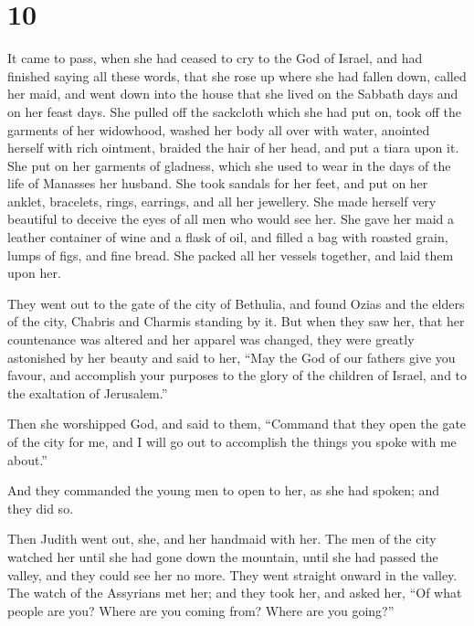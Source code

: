 \hypertarget{section-9}{%
\section{10}\label{section-9}}

 It came to pass, when she had ceased to cry to the God of
Israel, and had finished saying all these words,  that she
rose up where she had fallen down, called her maid, and went down into
the house that she lived on the Sabbath days and on her feast days.
 She pulled off the sackcloth which she had put on, took off
the garments of her widowhood, washed her body all over with water,
anointed herself with rich ointment, braided the hair of her head, and
put a tiara upon it. She put on her garments of gladness, which she used
to wear in the days of the life of Manasses her husband. 
She took sandals for her feet, and put on her anklet, bracelets, rings,
earrings, and all her jewellery. She made herself very beautiful to
deceive the eyes of all men who would see her.  She gave her
maid a leather container of wine and a flask of oil, and filled a bag
with roasted grain, lumps of figs, and fine bread. She packed all her
vessels together, and laid them upon her.

 They went out to the gate of the city of Bethulia, and
found Ozias and the elders of the city, Chabris and Charmis standing by
it.  But when they saw her, that her countenance was altered
and her apparel was changed, they were greatly astonished by her beauty
and said to her,  ``May the God of our fathers give you
favour, and accomplish your purposes to the glory of the children of
Israel, and to the exaltation of Jerusalem.''

Then she worshipped God,  and said to them, ``Command that
they open the gate of the city for me, and I will go out to accomplish
the things you spoke with me about.''

And they commanded the young men to open to her, as she had spoken;
 and they did so.

Then Judith went out, she, and her handmaid with her. The men of the
city watched her until she had gone down the mountain, until she had
passed the valley, and they could see her no more.  They
went straight onward in the valley. The watch of the Assyrians met her;
 and they took her, and asked her, ``Of what people are
you? Where are you coming from? Where are you going?''

